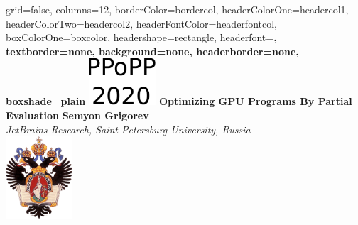 \documentclass[a0paper,portrait]{baposter}
\begin{document}
\setlength{\fboxsep}{0pt}


\begin{poster}{
grid=false,
columns=12, %
borderColor=bordercol, %
headerColorOne=headercol1, %
headerColorTwo=headercol2, %
headerFontColor=headerfontcol, %
boxColorOne=boxcolor, %
headershape=rectangle, %
headerfont=\Large\sf\bf, %
textborder=none,
background=none,
headerborder=none, %
boxshade=plain
}
{\includegraphics[width=2.5cm]{figures/PPoPP.pdf}}
%
%
{\bf \huge{Optimizing GPU Programs By Partial Evaluation} }
{\vspace{0.6em} \smaller \textbf{Semyon Grigorev} \\  %
\smaller \it {JetBrains Research, Saint Petersburg University, Russia } \\ %
}
{\includegraphics[width=2.5cm]{SPbGU_Logo.png}} %



\end{poster}
\end{document}
